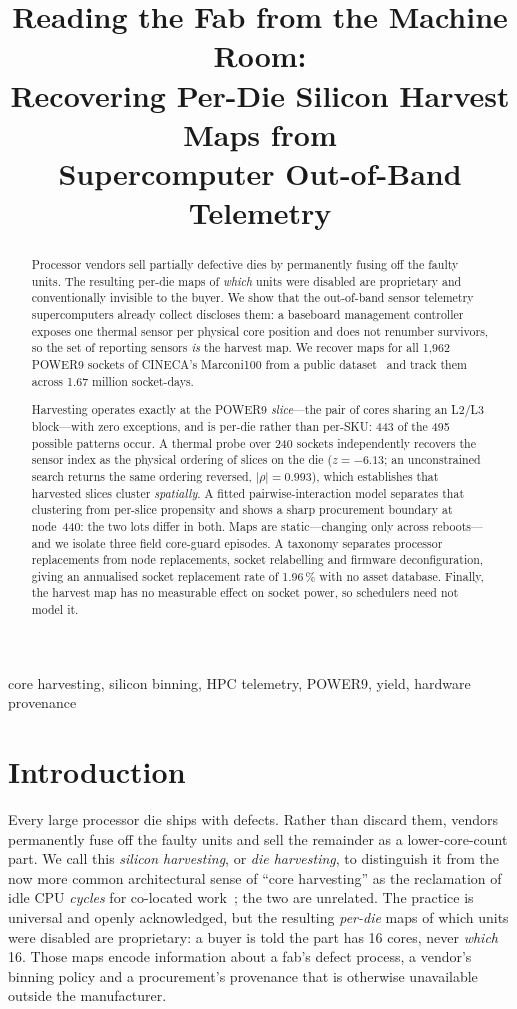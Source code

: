 \documentclass[10pt,conference]{IEEEtran}
\title{Reading the Fab from the Machine Room:\\
Recovering Per-Die Silicon Harvest Maps from\\
Supercomputer Out-of-Band Telemetry}
\author{\IEEEauthorblockN{Mohsen Seyedkazemi Ardebili}
\IEEEauthorblockA{\textit{Department of Electrical, Electronic and Information Engineering} \\
\textit{University of Bologna}, Italy \\ \texttt{mohsen.seyedkazemi@unibo.it}}
\and
\IEEEauthorblockN{Andrea Bartolini}
\IEEEauthorblockA{\textit{Department of Electrical, Electronic and Information Engineering} \\
\textit{University of Bologna}, Italy \\ \texttt{a.bartolini@unibo.it}}}
\begin{document}
\maketitle

\begin{abstract}
Processor vendors sell partially defective dies by permanently fusing off the faulty units. The
resulting per-die maps of \emph{which} units were disabled are proprietary and conventionally
invisible to the buyer. We show that the out-of-band sensor telemetry supercomputers already
collect discloses them: a baseboard management controller exposes one thermal sensor per physical
core position and does not renumber survivors, so the set of reporting sensors \emph{is} the
harvest map. We recover maps for all 1{,}962 POWER9 sockets of CINECA's Marconi100 from a public
dataset~\cite{borghesi2023m100} and track them across 1.67 million socket-days.

Harvesting operates exactly at the POWER9 \emph{slice}---the pair of cores sharing an L2/L3
block---with zero exceptions, and is per-die rather than per-SKU: 443 of the 495 possible patterns
occur. A thermal probe over 240 sockets independently recovers the sensor index as the physical
ordering of slices on the die ($z=-6.13$; an unconstrained search returns the same ordering
reversed, $|\rho|=0.993$), which establishes that harvested slices cluster \emph{spatially}. A
fitted pairwise-interaction model separates that clustering from per-slice propensity and shows a
sharp procurement boundary at node~440: the two lots differ in both. Maps are static---changing
only across reboots---and we isolate three field core-guard episodes. A taxonomy separates processor replacements from node
replacements, socket relabelling and firmware deconfiguration, giving an annualised socket
replacement rate of 1.96\,\% with no asset database. Finally, the harvest map has no measurable
effect on socket power, so schedulers need not model it.
\end{abstract}

\begin{IEEEkeywords}
core harvesting, silicon binning, HPC telemetry, POWER9, yield, hardware provenance
\end{IEEEkeywords}

\section{Introduction}
Every large processor die ships with defects. Rather than discard them, vendors permanently fuse
off the faulty units and sell the remainder as a lower-core-count part. We call this \emph{silicon
harvesting}, or \emph{die harvesting}, to distinguish it from the now more common architectural
sense of ``core harvesting'' as the reclamation of idle CPU \emph{cycles} for co-located
work~\cite{hardharvest2025}; the two are unrelated.
The practice is universal and openly acknowledged, but the resulting \emph{per-die} maps of which
units were disabled are proprietary: a buyer is told the part has 16 cores, never \emph{which} 16.
Those maps encode information about a fab's defect process, a vendor's binning policy and a
procurement's provenance that is otherwise unavailable outside the manufacturer.
\end{document}
